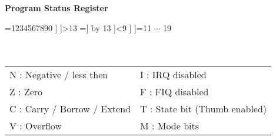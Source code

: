 \newcommand{\fakethirtytwobits}[1]{%
	\tiny
	\ifnum#1=1234567890
		#1
	\else
		\ifnum#1>13
			\count32=#1
			\advance\count32 by 13
			\the\count32%
		\else
			\ifnum#1<9
				#1%
			\else
				\ifnum#1=11
					$\cdots$%
				\fi
			\fi
		\fi
	\fi
}
\begin{minipage}{\textwidth}
\begin{framed}
	\begin{center}
		\textbf{Program Status Register}
	\end{center}
	\centering
	\ttfamily
	\begin{bytefield}[bitwidth=19px,endianness=big,bitformatting=\fakethirtytwobits]{19}
	  \\
	 \\
	   \\
	\end{bytefield}
	\begin{tabular}{ll}
	N : Negative / less then & I : IRQ disabled \\
	Z : Zero & F : FIQ disabled \\
	C : Carry / Borrow / Extend & T : State bit (Thumb enabled)\\
	V : Overflow & M : Mode bits \\
	\end{tabular} \\
\end{framed}
\end{minipage}
